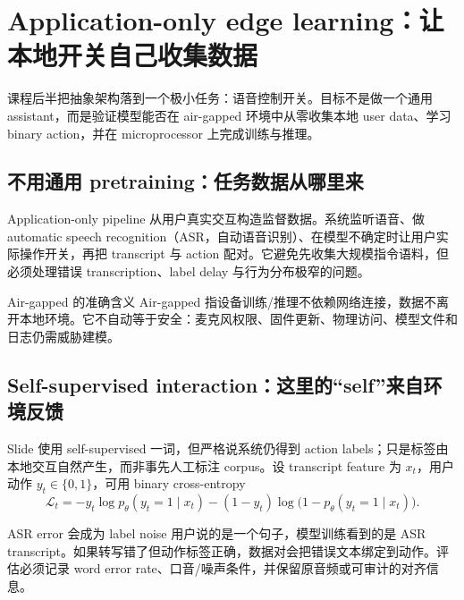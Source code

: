\section{Application-only edge learning：让本地开关自己收集数据}

课程后半把抽象架构落到一个极小任务：语音控制开关。目标不是做一个通用 assistant，而是验证模型能否在 air-gapped 环境中从零收集本地 user data、学习 binary action，并在 microprocessor 上完成训练与推理。

\subsection{不用通用 pretraining：任务数据从哪里来}

Application-only pipeline 从用户真实交互构造监督数据。系统监听语音、做 automatic speech recognition（ASR，自动语音识别）、在模型不确定时让用户实际操作开关，再把 transcript 与 action 配对。它避免先收集大规模指令语料，但必须处理错误 transcription、label delay 与行为分布极窄的问题。


\begin{importantbox}{Air-gapped 的准确含义}
Air-gapped 指设备训练/推理不依赖网络连接，数据不离开本地环境。它不自动等于安全：麦克风权限、固件更新、物理访问、模型文件和日志仍需威胁建模。
\end{importantbox}


\subsection{Self-supervised interaction：这里的“self”来自环境反馈}

Slide 使用 self-supervised 一词，但严格说系统仍得到 action labels；只是标签由本地交互自然产生，而非事先人工标注 corpus。设 transcript feature 为 $x_t$，用户动作 $y_t\in\{0,1\}$，可用 binary cross-entropy
\[
\mathcal L_t=-y_t\log p_\theta(y_t=1\mid x_t)
-(1-y_t)\log\bigl(1-p_\theta(y_t=1\mid x_t)\bigr).
\]


\begin{warningbox}{ASR error 会成为 label noise}
用户说的是一个句子，模型训练看到的是 ASR transcript。如果转写错了但动作标签正确，数据对会把错误文本绑定到动作。评估必须记录 word error rate、口音/噪声条件，并保留原音频或可审计的对齐信息。
\end{warningbox}

